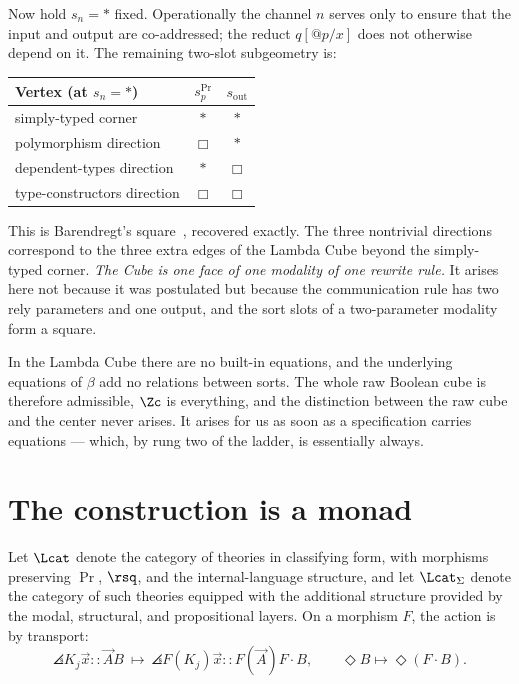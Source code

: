 Now hold $s_n = \ast$ fixed. Operationally the channel $n$ serves only to ensure that the
input and output are co-addressed; the reduct $q[@p/x]$ does not otherwise depend on it.
The remaining two-slot subgeometry is:

\begin{center}
\begin{tabular}{@{}lcc@{}}
\toprule
\textbf{Vertex (at $s_n = \ast$)} & $s_p^{\Pr}$ & $s_{\mathrm{out}}$ \\
\midrule
simply-typed corner        & $\ast$ & $\ast$ \\
polymorphism direction     & $\Box$ & $\ast$ \\
dependent-types direction  & $\ast$ & $\Box$ \\
type-constructors direction& $\Box$ & $\Box$ \\
\bottomrule
\end{tabular}
\end{center}

This is Barendregt's square~\cite{Barendregt1991}, recovered exactly. The three nontrivial
directions correspond to the three extra edges of the Lambda Cube beyond the simply-typed
corner. \emph{The Cube is one face of one modality of one rewrite rule.} It arises here
not because it was postulated but because the communication rule has two rely parameters
and one output, and the sort slots of a two-parameter modality form a square.

\begin{remark}
In the Lambda Cube there are no built-in equations, and the underlying equations of
$\beta$ add no relations between sorts. The whole raw Boolean cube is therefore
admissible, $\Zc$ is everything, and the distinction between the raw cube and the center
never arises. It arises for us as soon as a specification carries equations --- which, by
rung two of the ladder, is essentially always.
\end{remark}

\section{The construction is a monad}

Let $\Lcat$ denote the category of theories in classifying form, with morphisms preserving
$\Pr$, $\rsq$, and the internal-language structure, and let $\Lcat_\Sigma$ denote the
category of such theories equipped with the additional structure provided by the modal,
structural, and propositional layers. On a morphism $F$, the action is by transport:
\[
  \angles{K_j}{\vec x :: \vec A}{B} \ \longmapsto\
  \angles{F(K_j)}{\vec x :: F(\vec A)}{F \cdot B} ,
  \qquad \Diamond B \longmapsto \Diamond (F \cdot B) .
\]

